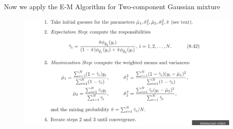 \documentclass[11pt]{beamer}
\begin{document}
\begin{frame}

\textsf{\linebreak\linebreak
Now we apply the E-M Algorithm for Two-component Gaussian mixture}
\begin{figure}
\includegraphics[scale=.315]{fig10.jpg}
\end{figure}
\end{frame}
\end{document}
